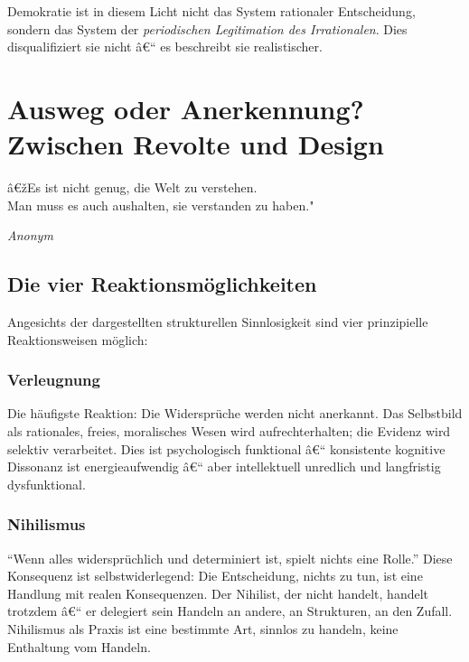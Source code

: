 ﻿\documentclass[12pt, a4paper]{article}
\begin{document}
Demokratie ist in diesem Licht nicht das System rationaler Entscheidung,
sondern das System der \emph{periodischen Legitimation des Irrationalen}.
Dies disqualifiziert sie nicht â€“ es beschreibt sie realistischer.

\section{Ausweg oder Anerkennung? Zwischen Revolte und Design}

\epigraph{â€žEs ist nicht genug, die Welt zu verstehen.\\
Man muss es auch aushalten, sie verstanden zu haben."}{\textit{Anonym}}

\subsection{Die vier Reaktionsmöglichkeiten}

Angesichts der dargestellten strukturellen Sinnlosigkeit sind vier prinzipielle
Reaktionsweisen möglich:

\subsubsection{Verleugnung}

Die häufigste Reaktion: Die Widersprüche werden nicht anerkannt. Das
Selbstbild als rationales, freies, moralisches Wesen wird aufrechterhalten;
die Evidenz wird selektiv verarbeitet. Dies ist psychologisch funktional â€“
konsistente kognitive Dissonanz ist energieaufwendig â€“ aber intellektuell
unredlich und langfristig dysfunktional.

\subsubsection{Nihilismus}

\enquote{Wenn alles widersprüchlich und determiniert ist, spielt nichts eine
Rolle.} Diese Konsequenz ist selbstwiderlegend: Die Entscheidung, nichts zu
tun, ist eine Handlung mit realen Konsequenzen. Der Nihilist, der nicht handelt,
handelt trotzdem â€“ er delegiert sein Handeln an andere, an Strukturen, an den
Zufall. Nihilismus als Praxis ist eine bestimmte Art, sinnlos zu handeln,
keine Enthaltung vom Handeln.
\end{document}
